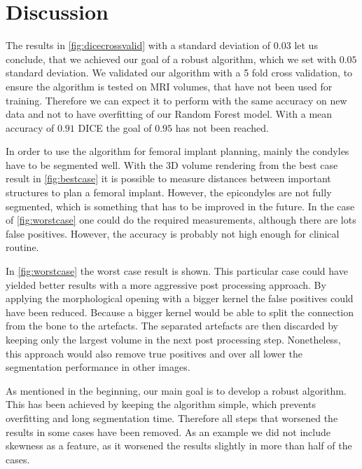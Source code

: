 \section{Discussion}
The results in \autoref{fig:dicecrossvalid} with a standard deviation of $0.03$ let us conclude, that we achieved our goal of a robust algorithm, which we set with $0.05$ standard deviation. We validated our algorithm with a 5 fold cross validation, to ensure the algorithm is tested on MRI volumes, that have not been used for training. Therefore we can expect it to perform with the same accuracy on new data and not to have overfitting of our Random Forest model. With a mean accuracy of $0.91$ DICE the goal of $0.95$ has not been reached. 

In order to use the algorithm for femoral implant planning, mainly the condyles have to be segmented well. With the 3D volume rendering from the best case result in \autoref{fig:bestcase} it is possible to measure distances between important structures to plan a femoral implant. However, the epicondyles are not fully segmented, which is something that has to be improved in the future. In the case of \autoref{fig:worstcase} one could do the required measurements, although there are lots false positives. However, the accuracy is probably not high enough for clinical routine.

In \autoref{fig:worstcase} the worst case result is shown. This particular case could have yielded better results with a more aggressive post processing approach. By applying the morphological opening with a bigger kernel the false positives could have been reduced. Because a bigger kernel would be able to split the connection from the bone to the artefacts. The separated artefacts are then discarded by keeping only the largest volume in the next post processing step. Nonetheless, this approach would also remove true positives and over all lower the segmentation performance in other images. 

As mentioned in the beginning, our main goal is to develop a robust algorithm. This has been achieved by keeping the algorithm simple, which prevents overfitting and long segmentation time. Therefore all steps that worsened the results in some cases have been removed. As an example we did not include skewness as a feature, as it worsened the results slightly in more than half of the cases.